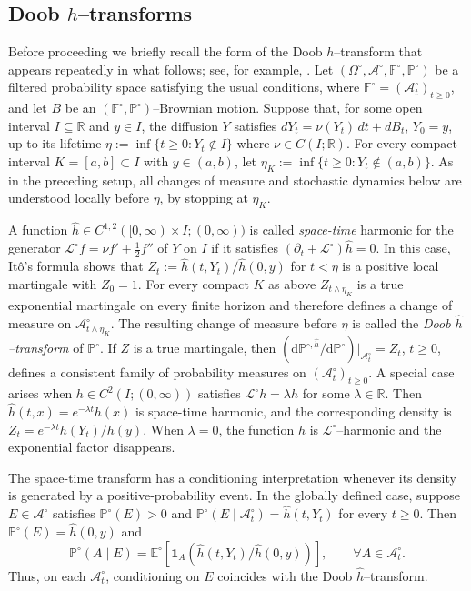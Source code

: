 \documentclass[11pt, reqno]{amsart}
\theoremstyle{plain}
\theoremstyle{remark}
\numberwithin{equation}{section}
\begin{document}
\subsection{Doob \texorpdfstring{$h$}{h}--transforms}\label{sec:doob}
Before proceeding we briefly recall the form of the Doob $h$--transform that appears repeatedly in what follows; see, for example, \cite{rogerswilliams2000}. Let $(\Omega^\circ,\mathcal A^\circ,\mathbb F^\circ,\mathbb P^\circ)$ be a filtered probability space satisfying the usual conditions, where $\mathbb F^\circ=(\mathcal A_t^\circ)_{t\geq0}$, and let $B$ be an $(\mathbb F^\circ, \mathbb P^\circ)$--Brownian motion. Suppose that, for some open interval $I\subseteq\mathbb R$ and $y\in I$, the diffusion $Y$ satisfies $dY_t=\nu(Y_t)\,dt+dB_t$, $Y_0=y$, up to its lifetime $\eta:=\inf\{t\geq0:Y_t\notin I\}$ where $\nu\in C(I;\mathbb{R})$. For every compact interval $K=[a,b]\subset I$ with $y\in(a,b)$, let $\eta_K:=\inf\{t\geq0:Y_t\notin(a,b)\}$.
As in the preceding setup, all changes of measure and stochastic dynamics below are understood locally before $\eta$, by stopping at $\eta_K$. 

A function \(\widehat h\in C^{1,2}([0,\infty)\times I;(0,\infty))\) is called \emph{space-time} harmonic for the generator $\mathcal L^\circ f = \nu f'+\frac12f''$ of $Y$ on $I$ if it satisfies $(\partial_t+\mathcal L^\circ)\widehat h=0$. In this case, It\^o's formula shows that $Z_t
:=
\widehat h(t,Y_t)/\widehat h(0,y)$
for $t<\eta$ is a positive local martingale with $Z_0=1$. For every compact \(K\) as above $Z_{t\wedge\eta_K}$ is a true exponential martingale on every finite horizon and therefore defines a change of measure on $\mathcal A_{t\wedge\eta_K}^\circ$. The resulting change of measure before $\eta$ is called the \emph{Doob $\widehat h$--transform} of $\mathbb P^\circ$.
If $Z$ is a true martingale, then $(\mathrm d\mathbb P^{\circ,\widehat h}/\mathrm d\mathbb P^\circ)|_{\mathcal A_t^\circ}=Z_t$, $t\geq0$, defines a consistent family of probability measures on $(\mathcal A_t^\circ)_{t\geq0}$.
%
A special case arises when $h\in C^2(I;(0,\infty))$ satisfies $\mathcal L^\circ h=\lambda h$
for some $\lambda\in\mathbb R$. Then $\widehat h(t,x)=e^{-\lambda t}h(x)$
is space-time harmonic, and the corresponding density is
$Z_t
=
e^{-\lambda t}h(Y_t)/h(y)
$.
When $\lambda=0$, the function $h$ is $\mathcal L^\circ$--harmonic and the exponential factor disappears.

The space-time transform has a conditioning interpretation whenever its density is generated by a positive-probability event. In the globally defined case, suppose $E\in\mathcal A^\circ$ satisfies $\mathbb P^\circ(E)>0$ and $\mathbb P^\circ(E\mid\mathcal A_t^\circ)=\widehat h(t,Y_t)$ for every $t\geq0$. Then $\mathbb P^\circ(E)=\widehat h(0,y)$ and
\begin{equation}\label{eq:doob-conditioning}
    \mathbb P^\circ(A\mid E)
    =
    \mathbb E^\circ\left[
        \mathbf 1_A
        (\widehat h(t,Y_t) /\widehat h(0,y))
    \right], \qquad \forall A\in\mathcal{A}^\circ_t.
\end{equation}
Thus, on each $\mathcal A_t^\circ$, conditioning on $E$ coincides with the Doob $\widehat h$--transform.
\end{document}
